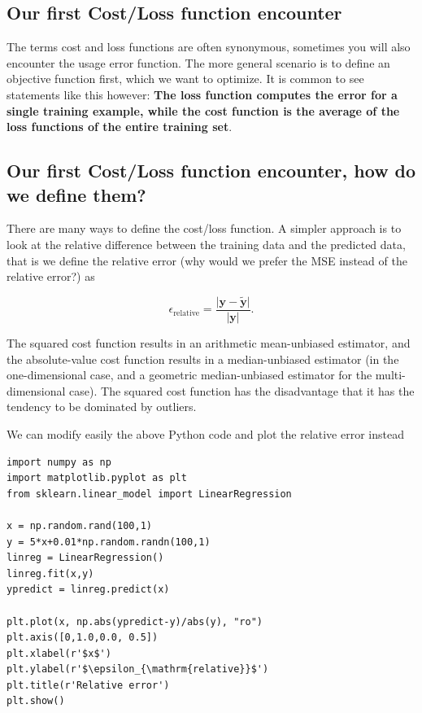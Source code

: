 \documentclass[%
oneside,                 %
final,                   %
10pt]{article}
\begin{document}
\subsection*{Our first Cost/Loss function encounter}

The terms cost and loss functions are often synonymous, sometimes you will also encounter the usage  error function.
The more general scenario is to define an objective function first, which we want to optimize.
It is common to see statements like this however: \textbf{The loss function computes the error for a single training example, while the cost function is the average of the loss functions of the entire training set}.

\subsection*{Our first Cost/Loss function encounter, how do we define them?}


There are many ways to define the cost/loss function. A simpler approach is to look at the relative difference between the training data and the predicted data, that is we define 
the relative error (why would we prefer the MSE instead of the relative error?) as

\[
\epsilon_{\mathrm{relative}}= \frac{\vert \bm{y} -\bm{\tilde{y}}\vert}{\vert \bm{y}\vert}.
\]

The squared cost function results in an arithmetic mean-unbiased
estimator, and the absolute-value cost function results in a
median-unbiased estimator (in the one-dimensional case, and a
geometric median-unbiased estimator for the multi-dimensional
case). The squared cost function has the disadvantage that it has the tendency
to be dominated by outliers.

We can modify easily the above Python code and plot the relative error instead
\begin{verbatim}
import numpy as np
import matplotlib.pyplot as plt
from sklearn.linear_model import LinearRegression

x = np.random.rand(100,1)
y = 5*x+0.01*np.random.randn(100,1)
linreg = LinearRegression()
linreg.fit(x,y)
ypredict = linreg.predict(x)

plt.plot(x, np.abs(ypredict-y)/abs(y), "ro")
plt.axis([0,1.0,0.0, 0.5])
plt.xlabel(r'$x$')
plt.ylabel(r'$\epsilon_{\mathrm{relative}}$')
plt.title(r'Relative error')
plt.show()
\end{verbatim}
\end{document}
